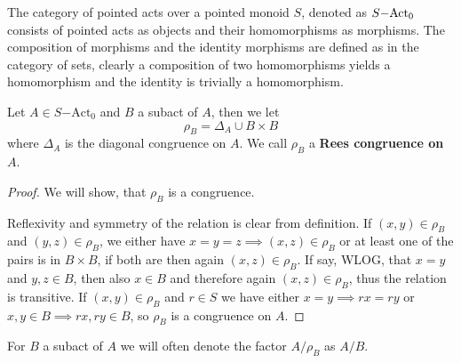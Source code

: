 \begin{remark}
    The category of pointed acts over a pointed monoid $S$, denoted as $S\mathrm{-Act}_0$ consists of pointed acts as objects and their homomorphisms as morphisms.
    The composition of morphisms and the identity morphisms are defined as in the category of sets, clearly a composition of two homomorphisms yields a homomorphism
    and the identity is trivially a homomorphism.
\end{remark}
\begin{definition}
    Let $A\in S\mathrm{-Act}_0$ and $B$ a subact of $A$, then we let 
    \[
        \rho_B = \Delta_A \cup B\times B
    \]
    where $\Delta_A$ is the diagonal congruence on $A$. We call $\rho_B$ a \textbf{Rees congruence on $A$}. 
\end{definition}
\begin{proof}
    We will show, that $\rho_B$ is a congruence. \par 
    Reflexivity and symmetry of the relation is clear from definition. If $(x,y)\in\rho_B$ and $(y,z)\in\rho_B$, we either have 
    $x=y=z \implies (x,z)\in\rho_B$ or at least one of the pairs is in $B\times B$, if both are then again $(x,z)\in\rho_B$. If 
    say, WLOG, that $x=y$ and $y,z\in B$, then also $x\in B$ and therefore again $(x,z)\in\rho_B$, thus the relation is transitive. 
    If $(x,y)\in\rho_B$ and $r\in S$ we have either $x=y\implies rx=ry$ or $x,y\in B \implies rx,ry\in B$, so $\rho_B$ is a congruence on $A$.
\end{proof}
\begin{remark}
    For $B$ a subact of $A$ we will often denote the factor $A/\rho_B$ as $A/B$. 
\end{remark}


